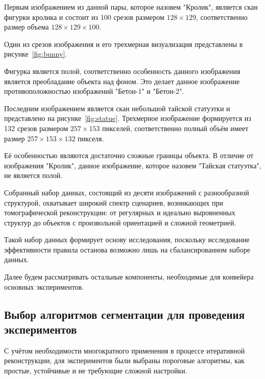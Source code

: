 Первым изображением из данной пары, которое назовем "Кролик", является скан фигурки кролика и состоит из 100 срезов размером \(128 \times 129\), соответственно размер объема \(128 \times 129 \times 100\).

Один из срезов изображения и его трехмерная визуализация представлены в рисунке~\ref{fig:bunny}.

Фигурка является полой, соответственно особенность данного изображения является преобладание объекта над фоном. Это делает данное изображение противоположностью изображений "Бетон-1" и "Бетон-2".


Последним изображением является скан небольшой тайской статуэтки и представлено на рисунке~\ref{fig:statue}. Трехмерное изображение формируется из 132 срезов размером \(257 \times 153\) пикселей, соответственно полный объём имеет размер \(257 \times 153 \times 132\) пикселя.

Её особенностью являются достаточно сложные границы объекта. В отличие от изображения "Кролик", данное изображение, которое назовем "Тайская статуэтка", не является полой.


Собранный набор данных, состоящий из десяти изображений с разнообразной структурой, охватывает широкий спектр сценариев, возникающих при томографической реконструкции: от регулярных и идеально выровненных структур до объектов с произвольной ориентацией и сложной геометрией.

Такой набор данных формирует основу исследования, поскольку исследование эффективности правила останова возможно лишь на сбалансированном наборе данных. 

Далее будем рассматривать остальные компоненты, необходимые для конвейера основных экспериментов.

\subsection{Выбор алгоритмов сегментации для проведения экспериментов}

С учётом необходимости многократного применения в процессе итеративной реконструкции, для экспериментов были выбраны пороговые алгоритмы, как простые, устойчивые и не требующие сложной настройки.

